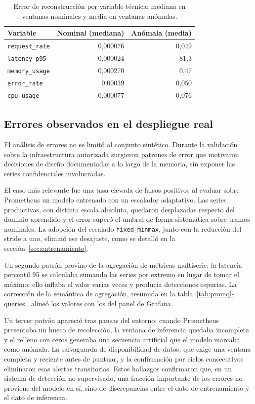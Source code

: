 \begin{table}[H]
\centering
\small
\caption{Error de reconstrucción por variable técnica: mediana en ventanas nominales y media en ventanas anómalas.}
\label{tab:error-por-variable}
\begin{tabular}{@{}p{}rr@{}}
\toprule
\textbf{Variable} & \textbf{Nominal (mediana)} & \textbf{Anómala (media)} \\
\midrule
\texttt{request\_rate} & 0{,}000076 & 0{,}049 \\
\texttt{latency\_p95} & 0{,}000024 & 81{,}3 \\
\texttt{memory\_usage} & 0{,}000270 & 0{,}47 \\
\texttt{error\_rate} & 0{,}00039 & 0{,}050 \\
\texttt{cpu\_usage} & 0{,}000077 & 0{,}076 \\
\bottomrule
\end{tabular}
\end{table}

\subsection{Errores observados en el despliegue real}

El análisis de errores no se limitó al conjunto sintético. Durante la validación sobre la infraestructura autorizada surgieron patrones de error que motivaron decisiones de diseño documentadas a lo largo de la memoria, sin exponer las series confidenciales involucradas.

El caso más relevante fue una tasa elevada de falsos positivos al evaluar sobre Prometheus un modelo entrenado con un escalador adaptativo. Las series productivas, con distinta escala absoluta, quedaron desplazadas respecto del dominio aprendido y el error superó el umbral de forma sistemática sobre tramos nominales. La adopción del escalado \texttt{fixed\_minmax}, junto con la reducción del stride a uno, eliminó ese desajuste, como se detalló en la sección~\ref{sec:entrenamiento}.

Un segundo patrón provino de la agregación de métricas multiserie: la latencia percentil 95 se calculaba sumando las series por extremo en lugar de tomar el máximo; ello inflaba el valor varias veces y producía detecciones espurias. La corrección de la semántica de agregación, resumida en la tabla~\ref{tab:promql-queries}, alineó los valores con los del panel de Grafana.

Un tercer patrón apareció tras pausas del entorno: cuando Prometheus presentaba un hueco de recolección, la ventana de inferencia quedaba incompleta y el relleno con ceros generaba una secuencia artificial que el modelo marcaba como anómala. La salvaguarda de disponibilidad de datos, que exige una ventana completa y reciente antes de puntuar, y la confirmación por ciclos consecutivos eliminaron esas alertas transitorias. Estos hallazgos confirmaron que, en un sistema de detección no supervisado, una fracción importante de los errores no proviene del modelo en sí, sino de discrepancias entre el dato de entrenamiento y el dato de inferencia.

